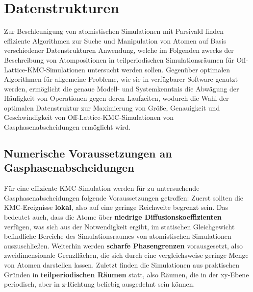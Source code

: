 \section{Datenstrukturen}
\label{datastructures}

Zur Beschleunigung von atomistischen Simulationen mit Parsivald finden effiziente Algorithmen zur Suche und Manipulation von Atomen auf Basis verschiedener Datenstrukturen Anwendung, welche im Folgenden zwecks der Beschreibung von Atompositionen in teilperiodischen Simulationsräumen für Off-Lattice-KMC-Simulationen untersucht werden sollen.
Gegenüber optimalen Algorithmen für allgemeine Probleme, wie sie in verfügbarer Software genutzt werden, ermöglicht die genaue Modell- und Systemkenntnis die Abwägung der Häufigkeit von Operationen gegen deren Laufzeiten,
wodurch die Wahl der optimalen Datenstruktur zur Maximierung von Größe, Genauigkeit und Geschwindigkeit von Off-Lattice-KMC-Simulationen von Gasphasenabscheidungen ermöglicht wird.

\subsection{Numerische Voraussetzungen an Gasphasenabscheidungen}

Für eine effiziente KMC-Simulation werden für zu untersuchende Gasphasenabscheidungen folgende Voraussetzungen getroffen:
Zuerst sollten die KMC-Ereignisse \textbf{lokal}, also auf eine geringe Reichweite begrenzt sein.
Das bedeutet auch, dass die Atome über \textbf{niedrige Diffusionskoeffizienten} verfügen, was sich aus der Notwendigkeit ergibt, im statischen Gleichgewicht befindliche Bereiche des Simulationsraumes von atomistischen Simulationen auszuschließen.
Weiterhin werden \textbf{scharfe Phasengrenzen} vorausgesetzt, also zweidimensionale Grenzflächen, die sich durch eine vergleichsweise geringe Menge von Atomen darstellen lassen.
Zuletzt finden die Simulationen aus praktischen Gründen in \textbf{teilperiodischen Räumen} statt, also Räumen, die in der xy-Ebene periodisch, aber in z-Richtung beliebig ausgedehnt sein können.


